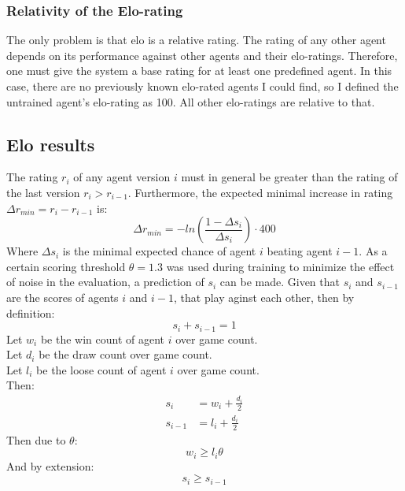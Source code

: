 \documentclass[12pt]{article}
\begin{document}
\subsubsection{Relativity of the Elo-rating}
The only problem is that elo is a relative rating. The rating of any other agent depends on its performance against other agents and their elo-ratings. Therefore, one must give the system a base rating for at least one predefined agent. In this case, there are no previously known elo-rated agents I could find, so I defined the untrained agent's elo-rating as 100. All other elo-ratings are relative to that.

\subsection{Elo results}
The rating \(r_i\) of any agent version \(i\) must in general be greater than the rating of the last version \(r_i > r_{i-1}\). Furthermore, the expected minimal increase in rating \(\Delta r_{min} = r_i - r_{i-1}\) is:
\begin{equation}\label{eq:deltaRCalculation}
\Delta r_{min} = -ln\left(\frac{1- \Delta s_i}{\Delta s_i}\right)\cdot 400
\end{equation}
Where \(\Delta s_i\) is the minimal expected chance of agent \(i\) beating agent \(i-1\).
As a certain scoring threshold \(\theta = 1.3\) was used during training to minimize the effect of noise in the evaluation, a prediction of \(s_i\) can be made. Given that \(s_i\) and \(s_{i-1}\) are the scores of agents \(i\) and \(i-1\), that play aginst each other, then by definition:
\begin{equation}\label{eq:scoreSumm}
s_i + s_{i-1} = 1
\end{equation}
Let \(w_i\) be the win count of agent \(i\) over game count.\\
Let \(d_i\) be the draw count over game count.\\
Let \(l_i\) be the loose count of agent \(i\) over game count.\\
Then:
\begin{align}
s_i &= w_i + \frac{d_i}{2}\\
s_{i-1} &= l_i + \frac{d_i}{2}
\end{align}
Then due to \(\theta\):
\begin{equation}
w_i \geqslant l_i \theta
\end{equation}
And by extension:
\begin{equation}
s_i \geqslant s_{i-1}
\end{equation}
\end{document}
